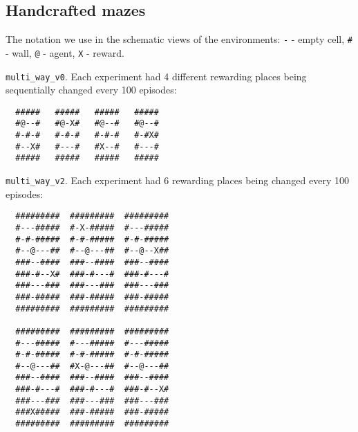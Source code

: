 \documentclass[a4paper,twoside]{article}
\begin{document}
\subsection{Handcrafted mazes} \label{apx_handcrafted_mazes}

The notation we use in the schematic views of the environments: \verb|-| - empty cell, \verb|#| - wall, \verb|@| - agent, \verb|X| - reward.

\texttt{multi\_way\_v0}. Each experiment had 4 different rewarding places being sequentially changed every 100 episodes:

\begin{verbatim}
  #####   #####   #####   #####
  #@--#   #@-X#   #@--#   #@--#
  #-#-#   #-#-#   #-#-#   #-#X#
  #--X#   #---#   #X--#   #---#
  #####   #####   #####   #####
\end{verbatim}

\texttt{multi\_way\_v2}. Each experiment had 6 rewarding places being changed every 100 episodes:

\begin{verbatim}
  #########  #########  #########
  #---#####  #-X-#####  #---#####
  #-#-#####  #-#-#####  #-#-#####
  #--@---##  #--@---##  #--@--X##
  ###--####  ###--####  ###--####
  ###-#--X#  ###-#---#  ###-#---#
  ###---###  ###---###  ###---###
  ###-#####  ###-#####  ###-#####
  #########  #########  #########

  #########  #########  #########
  #---#####  #---#####  #---#####
  #-#-#####  #-#-#####  #-#-#####
  #--@---##  #X-@---##  #--@---##
  ###--####  ###--####  ###--####
  ###-#---#  ###-#---#  ###-#--X#
  ###---###  ###---###  ###---###
  ###X#####  ###-#####  ###-#####
  #########  #########  #########
\end{verbatim}
\end{document}
